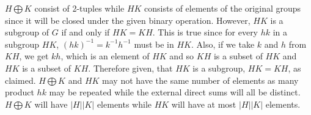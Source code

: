 \documentclass{article}
\begin{document}
\begin{enumerate}
    \begin{flushleft}
    $H \bigoplus K$ consist of 2-tuples while $HK$ consists of elements of the original groups since it will be closed under the given binary operation. However, $HK$ is a subgroup of $G$ if and only if $HK = KH$. This is true since for every $hk$ in a subgroup $HK$, $(hk)^{-1} = k^{-1}h^{-1}$ must be in $HK$. Also, if we take $k$ and $h$ from $KH$, we get $kh$, which is an element of $HK$ and so $KH$ is a subset of $HK$ and $HK$ is a subset of $KH$. Therefore given, that $HK$ is a subgroup, $HK = KH$, as claimed. $H \bigoplus K$ and $HK$ may not have the same number of elements as many product $hk$ may be repeated while the external direct sums will all be distinct. $H \bigoplus K$ will have $|H||K|$ elements while $HK$ will have at most $|H||K|$ elements.
    \end{flushleft}
\end{enumerate}
\end{document}
